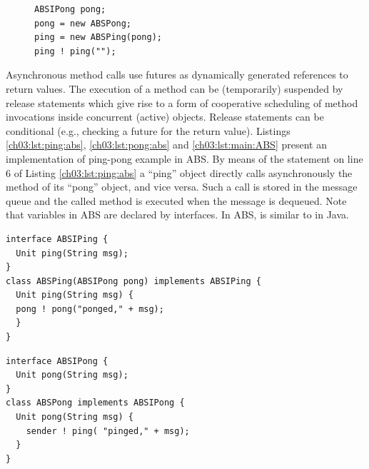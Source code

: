 \lstset{language=Java}
\begin{figure}[h]
\begin{lstlisting}[caption=main in ABS,label=lst:main:ABS]
ABSIPong pong;
pong = new ABSPong;
ping = new ABSPing(pong);
ping ! ping("");
\end{lstlisting}
\end{figure}

Asynchronous method calls use futures as dynamically generated references  to return values.
The execution of a method can be (temporarily) suspended by release statements which give rise to a form
of  cooperative scheduling of method invocations inside concurrent (active) objects.
Release statements can be conditional (e.g., checking a future for the return value).
Listings \ref{ch03:lst:ping:abs}, \ref{ch03:lst:pong:abs} and \ref{ch03:lst:main:ABS} present an implementation of ping-pong example in ABS.
By means of the statement on line 6 of Listing \ref{ch03:lst:ping:abs}
a ``ping'' object  directly calls asynchronously the  method  of its ``pong'' object, and vice versa.
Such a call is stored in the message queue and the called method is executed when the message is dequeued.
Note that variables in ABS are declared by interfaces.
In ABS,  is similar to  in Java.

\lstset{language=abs}
\begin{center}
\begin{minipage}[t]{0.48\textwidth}
\begin{lstlisting}[caption=Ping in ABS,label=lst:ping:abs]
interface ABSIPing {
  Unit ping(String msg);
}
class ABSPing(ABSIPong pong) implements ABSIPing {
  Unit ping(String msg) {
  pong ! pong("ponged," + msg);
  }
}
\end{lstlisting}
\end{minipage}
\hfill
\begin{minipage}[t]{0.48\textwidth}
\begin{lstlisting}[caption=Pong in ABS,label=lst:pong:abs]
interface ABSIPong {
  Unit pong(String msg);
}
class ABSPong implements ABSIPong {
  Unit pong(String msg) {
    sender ! ping( "pinged," + msg);
  }
}
\end{lstlisting}
\end{minipage}
\end{center}
\lstset{language=Java}

